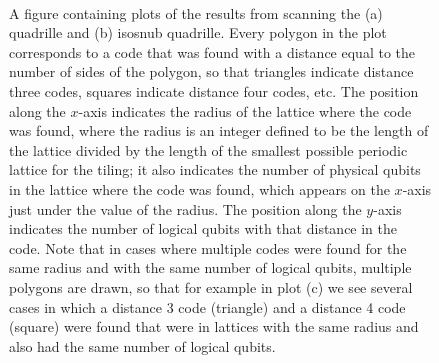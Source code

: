 \documentclass[12pt]{amsbook}
\theoremstyle{plain}
\theoremstyle{definition}
\theoremstyle{remark}
\begin{document}
\begin{figure}
\centering
{}\\
\caption{
\label{figure:results-quadrille1}
A figure containing plots of the results from scanning the (a) quadrille and (b) isosnub quadrille.  Every polygon in the plot corresponds to a code that was found with a distance equal to the number of sides of the polygon, so that triangles indicate distance three codes, squares indicate distance four codes, etc.  The position along the $x$-axis indicates the radius of the lattice where the code was found, where the radius is an integer defined to be the length of the lattice divided by the length of the smallest possible periodic lattice for the tiling;  it also indicates the number of physical qubits in the lattice where the code was found, which appears on the $x$-axis just under the value of the radius.  The position along the $y$-axis indicates the number of logical qubits with that distance in the code.
Note that in cases where multiple codes were found for the same radius and with the same number of logical qubits, multiple polygons are drawn, so that for example in plot (c) we see several cases in which a distance 3 code (triangle) and a distance 4 code (square) were found that were in lattices with the same radius and also had the same number of logical qubits.
}
\end{figure}
\end{document}
